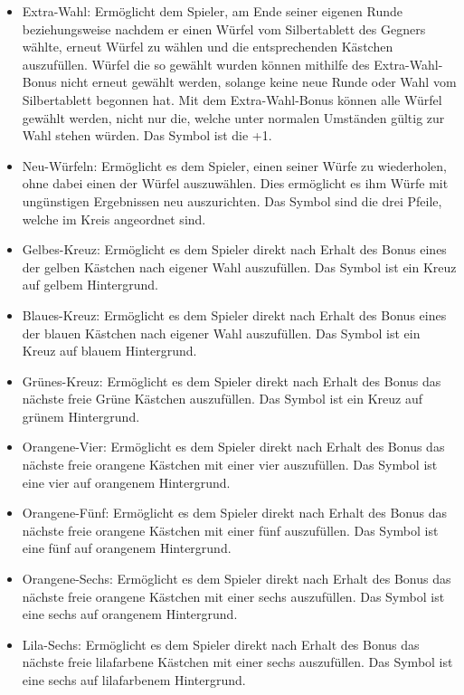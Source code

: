 \begin{itemize}
\item Extra-Wahl: Ermöglicht dem Spieler, am Ende seiner eigenen Runde beziehungsweise nachdem er einen Würfel vom Silbertablett des Gegners wählte, erneut Würfel zu wählen und die entsprechenden Kästchen auszufüllen. Würfel die so gewählt wurden können mithilfe des Extra-Wahl-Bonus nicht erneut gewählt werden, solange keine neue Runde oder Wahl vom Silbertablett begonnen hat. Mit dem Extra-Wahl-Bonus können alle Würfel gewählt werden, nicht nur die, welche unter normalen Umständen gültig zur Wahl stehen würden. Das Symbol ist die +1.

\item Neu-Würfeln: Ermöglicht es dem Spieler, einen seiner Würfe zu wiederholen, ohne dabei einen der Würfel auszuwählen. Dies ermöglicht es ihm Würfe mit ungünstigen Ergebnissen neu auszurichten. Das Symbol sind die drei Pfeile, welche im Kreis angeordnet sind.

\item Gelbes-Kreuz: Ermöglicht es dem Spieler direkt nach Erhalt des Bonus eines der gelben Kästchen nach eigener Wahl auszufüllen. Das Symbol ist ein Kreuz auf gelbem Hintergrund.

\item Blaues-Kreuz: Ermöglicht es dem Spieler direkt nach Erhalt des Bonus eines der blauen Kästchen nach eigener Wahl auszufüllen. Das Symbol ist ein Kreuz auf blauem Hintergrund.

\item Grünes-Kreuz: Ermöglicht es dem Spieler direkt nach Erhalt des Bonus das nächste freie Grüne Kästchen auszufüllen. Das Symbol ist ein Kreuz auf grünem Hintergrund.

\item Orangene-Vier: Ermöglicht es dem Spieler direkt nach Erhalt des Bonus das nächste freie orangene Kästchen mit einer vier auszufüllen. Das Symbol ist eine vier auf orangenem Hintergrund.

\item Orangene-Fünf: Ermöglicht es dem Spieler direkt nach Erhalt des Bonus das nächste freie orangene Kästchen mit einer fünf auszufüllen. Das Symbol ist eine fünf auf orangenem Hintergrund.

\item Orangene-Sechs: Ermöglicht es dem Spieler direkt nach Erhalt des Bonus das nächste freie orangene Kästchen mit einer sechs auszufüllen. Das Symbol ist eine sechs auf orangenem Hintergrund.

\item Lila-Sechs: Ermöglicht es dem Spieler direkt nach Erhalt des Bonus das nächste freie lilafarbene Kästchen mit einer sechs auszufüllen. Das Symbol ist eine sechs auf lilafarbenem Hintergrund. \\
\end{itemize}

